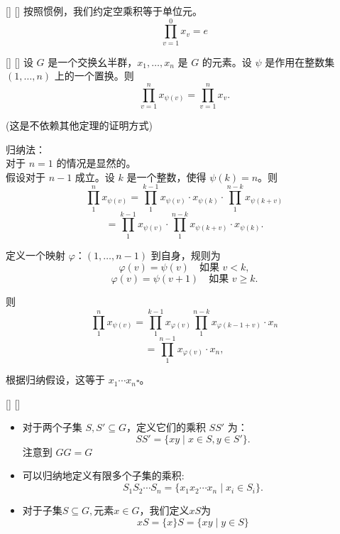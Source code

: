 \documentclass[UTF8]{ctexart}
\begin{document}
		\begin{dfn}
            []
            {}
            []
            []
			按照惯例，我们约定空乘积等于单位元。
			\[
			\prod_{v=1}^{0}x_v =e
			\]
		\end{dfn}

		\begin{ppt}
            []
            {}
            []
            []
			设 \( G \) 是一个交换幺半群，\( x_1, \ldots, x_n \) 是 \( G \) 的元素。设 \( \psi \) 是作用在整数集 \( (1, \ldots, n) \) 上的一个置换。则
			\[
			\prod_{v=1}^n x_{\psi(v)} = \prod_{v=1}^n x_v.
			\]
		\end{ppt}

		\begin{prf}(这是不依赖其他定理的证明方式)

			归纳法：
			\\对于 \( n = 1 \) 的情况是显然的。\\假设对于 \( n - 1 \) 成立。设 \( k \) 是一个整数，使得 \( \psi(k) = n \)。则
			\[
			\prod_{1}^{n} x_{\psi(v)} = \prod_{1}^{k-1} x_{\psi(v)} \cdot x_{\psi(k)} \cdot \prod_{1}^{n-k} x_{\psi(k+v)}
			\]
			\[
			= \prod_{1}^{k-1} x_{\psi(v)} \cdot \prod_{1}^{n-k} x_{\psi(k+v)} \cdot x_{\psi(k)}.
			\]

			定义一个映射 \( \varphi \)：\( (1, \ldots, n-1) \) 到自身，规则为
			\[
			\varphi(v) = \psi(v) \quad \text{如果 } v < k,
			\]
			\[
			\varphi(v) = \psi(v + 1) \quad \text{如果 } v \geq k.
			\]

			则
			\[
			\prod_{1}^{n} x_{\psi(v)} = \prod_{1}^{k-1} x_{\varphi(v)} \prod_{1}^{n-k} x_{\varphi(k-1+v)} \cdot x_n
			\]
			\[
			= \prod_{1}^{n-1} x_{\varphi(v)} \cdot x_n,
			\]

			根据归纳假设，这等于 \( x_1 \cdots x_n \)$\square$。
		\end{prf}

		\begin{dfn}
            []
            {}
            []
            []
			\hspace{1cm}
			\begin{itemize}
				\item 对于两个子集 \( S, S' \subseteq G \)，定义它们的乘积 \( SS' \) 为：
				\[
				SS' = \{ xy \mid x \in S, y \in S' \}.
				\]注意到 \( GG = G \)
				\item 可以归纳地定义有限多个子集的乘积:
				\[
				S_1 S_2 \cdots S_n = \{ x_1 x_2 \cdots x_n \mid x_i \in S_i \}.
				\]
				\item 对于子集\( S \subseteq G , \text{元素}x \in G\)，我们定义\(xS\)为
				\[
				xS=\{x\}S=\{xy \mid y \in S\}
				\]
			  \end{itemize}
		\end{dfn}
\end{document}
